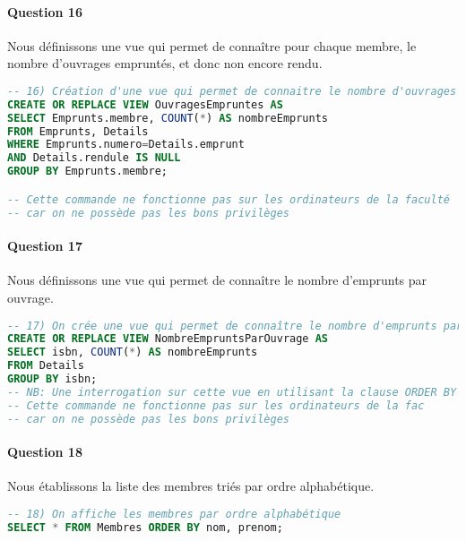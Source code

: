 \documentclass[10pt, oneside]{article}
\begin{document}

\paragraph{Question 16} Nous définissons une vue qui permet de connaître pour chaque membre, le nombre d'ouvrages empruntés, et donc non encore rendu.

\begin{lstlisting}[language=sql, title=Question 16, label=QII16]
-- 16) Création d'une vue qui permet de connaitre le nombre d'ouvrages emprunté par chaque membre et donc de connaitre les ouvrages non restitués
CREATE OR REPLACE VIEW OuvragesEmpruntes AS
SELECT Emprunts.membre, COUNT(*) AS nombreEmprunts
FROM Emprunts, Details
WHERE Emprunts.numero=Details.emprunt
AND Details.rendule IS NULL
GROUP BY Emprunts.membre;

-- Cette commande ne fonctionne pas sur les ordinateurs de la faculté 
-- car on ne possède pas les bons privilèges
\end{lstlisting}


\paragraph{Question 17} Nous définissons une vue qui permet de connaître le nombre d'emprunts par ouvrage. 

\begin{lstlisting}[language=sql, title=Question 17, label=QII17)]
-- 17) On crée une vue qui permet de connaître le nombre d'emprunts par ouvrage
CREATE OR REPLACE VIEW NombreEmpruntsParOuvrage AS 
SELECT isbn, COUNT(*) AS nombreEmprunts
FROM Details
GROUP BY isbn;
-- NB: Une interrogation sur cette vue en utilisant la clause ORDER BY permettra d'afficher les ouvrages par ordre décroissant du nombre de locations
-- Cette commande ne fonctionne pas sur les ordinateurs de la fac 
-- car on ne possède pas les bons privilèges
\end{lstlisting}


\paragraph{Question 18} Nous établissons la liste des membres triés par ordre alphabétique.

\begin{lstlisting}[language=sql, title=Question 18, label=QII18]
-- 18) On affiche les membres par ordre alphabétique
SELECT * FROM Membres ORDER BY nom, prenom;
\end{lstlisting}
\end{document}
